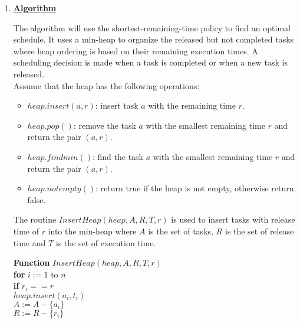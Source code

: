 \documentclass[11pt]{article}
\begin{document}
\begin{enumerate}
\begin{enumerate}
\begin{proof}
  By induction on the number of iterations, when the algorithm
  terminates, $A$ is still a prefix-subsequence of an optimal schedule
  sequence. And when the algorithm terminates, $A$ would contain all
  $n$ tasks, no other schedule sequence can properly contain $A$, thus
  $A$ is the optimal schedule sequence.
\end{proof}

\item %

\underline{\textbf{Algorithm}}

The algorithm will use the shortest-remaining-time policy to find an
optimal schedule. It uses a min-heap to organize the released but not
completed tasks where heap ordering is based on their remaining
execution times. A scheduling decision is made when a task is
completed or when a new task is released.\\

Assume that the heap has the following operations:
\begin{itemize}
\item $heap.insert(a,r)$: insert task $a$ with the remaining time $r$.
\item $heap.pop()$: remove the task $a$ with the smallest remaining
  time $r$ and return the pair $(a,r)$.
\item $heap.findmin()$: find the task $a$ with the smallest remaining
  time $r$ and return the pair $(a,r)$.
\item $heap.notempty()$: return true if the heap is not empty,
  otherwise return false.\\
\end{itemize}

The routine $InsertHeap(heap, A, R, T, r)$ is used to insert tasks
with release time of $r$ into the min-heap where $A$ is the set of
tasks, $R$ is the set of release time and $T$ is the set of execution
time. 

\textbf{Function} $InsertHeap(heap, A, R, T, r)$\\
\-\hspace{3em} \textbf{for} $i := 1$ to $n$\\
\-\hspace{5em} \textbf{if} $r_i == r$\\
\-\hspace{7em} $heap.insert(a_i, t_i)$\\
\-\hspace{7em} $A := A - \{a_i\}$\\
\-\hspace{7em} $R := R - \{r_i\}$\\


\end{enumerate}
\end{enumerate}
\end{document}
